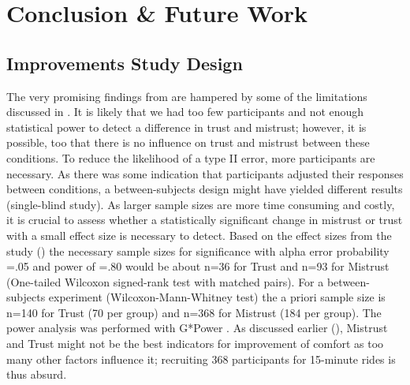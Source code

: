 \chapter{Conclusion \& Future Work}
\label{ch:conclusion}
\section{Improvements Study Design}
\label{ImproveStudy}
The very promising findings from \emph{} are hampered by some of the limitations discussed in \emph{}. It is likely that we had too few participants and not enough statistical power to detect a difference in trust and mistrust; however, it is possible, too that there is no influence on trust and mistrust between these conditions. To reduce the likelihood of a type II error, more participants are necessary. As there was some indication that participants adjusted their responses between conditions, a between-subjects design might have yielded different results (single-blind study). 
As larger sample sizes are more time consuming and costly, it is crucial to assess whether a statistically significant change in mistrust or trust with a small effect size is necessary to detect.  Based on the effect sizes from the study (\emph{}) the necessary sample sizes for significance with alpha error probability =.05 and power of =.80 would be about n=36 for Trust and n=93 for Mistrust (One-tailed Wilcoxon signed-rank test with matched pairs). For a between-subjects experiment (Wilcoxon-Mann-Whitney test) the a priori sample size is n=140 for Trust (70 per group) and n=368 for Mistrust (184 per group). The power analysis was performed with G*Power \cite{Faul2007GPower:Sciences.}. As discussed earlier (\emph{}),  Mistrust and Trust might not be the best indicators for improvement of comfort as too many other factors influence it; recruiting 368 participants for 15-minute rides is thus absurd. 


